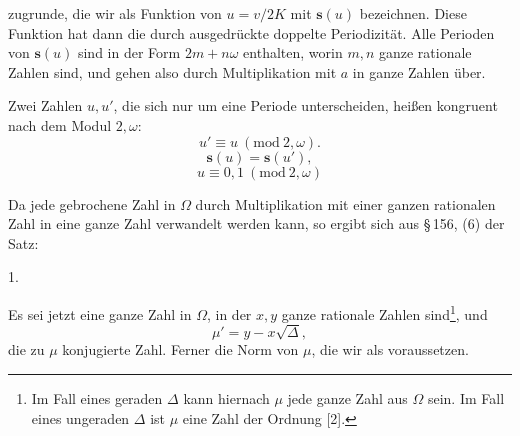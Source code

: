
zugrunde, die wir als Funktion von $u = v/2K$ mit $\boldsymbol{s}(u)$ bezeichnen. Diese Funktion hat dann die durch
ausgedrückte doppelte Periodizität. Alle Perioden von $\boldsymbol{s}(u)$ sind in der Form $2m + n\omega$ enthalten, worin $m, n$ ganze rationale Zahlen sind, und gehen also durch Multiplikation mit $a$ in ganze Zahlen über.

Zwei Zahlen $u, u'$, die sich nur um eine Periode unterscheiden, hei\ss en kongruent nach dem Modul $2, \omega$:
\[
u' \equiv u \ (\mathrm{mod}\ 2, \omega).
\]
\[
\boldsymbol{s}(u) = \boldsymbol{s}(u'),
\]
\[
u \equiv 0, 1 \ (\mathrm{mod}\ 2, \omega)
\]

Da jede gebrochene Zahl in $\Omega$ durch Multiplikation mit einer ganzen rationalen Zahl in eine ganze Zahl verwandelt werden kann, so ergibt sich aus \S\,156, (6) der Satz:

1. 

Es sei jetzt
eine ganze Zahl in $\Omega$, in der $x, y$ ganze rationale Zahlen sind\footnote{Im Fall eines geraden $\varDelta$ kann hiernach $\mu$ jede ganze Zahl aus $\Omega$ sein. Im Fall eines ungeraden $\varDelta$ ist $\mu$ eine Zahl der Ordnung [2].}, und
\[
\mu' = y - x\sqrt{\varDelta},
\]
die zu $\mu$ konjugierte Zahl. Ferner
die Norm von $\mu$, die wir als  voraussetzen.
